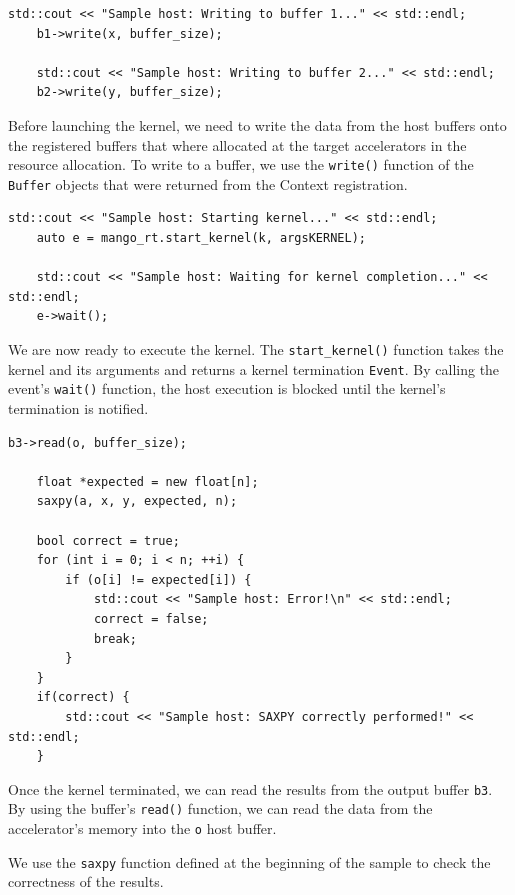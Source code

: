 \begin{lstlisting}[style=CStyle, caption=Sample - Writing buffers]
    std::cout << "Sample host: Writing to buffer 1..." << std::endl;
    b1->write(x, buffer_size);

    std::cout << "Sample host: Writing to buffer 2..." << std::endl;
    b2->write(y, buffer_size);
\end{lstlisting}

Before launching the kernel, we need to write the data from the host buffers onto the registered buffers that where allocated at the target accelerators in the resource allocation. To write to a buffer, we use the \texttt{write()} function of the \texttt{Buffer} objects that were returned from the Context registration.
    
\begin{lstlisting}[style=CStyle, caption=Sample - Kernel launch]
    std::cout << "Sample host: Starting kernel..." << std::endl;
    auto e = mango_rt.start_kernel(k, argsKERNEL);

    std::cout << "Sample host: Waiting for kernel completion..." << std::endl;
    e->wait();
\end{lstlisting}

We are now ready to execute the kernel. The \texttt{start\_kernel()} function takes the kernel and its arguments and returns a kernel termination \texttt{Event}. By calling the event's \texttt{wait()} function, the host execution is blocked until the kernel's termination is notified.

\begin{lstlisting}[style=CStyle, caption=Sample - Checking results]
    b3->read(o, buffer_size);

    float *expected = new float[n];
    saxpy(a, x, y, expected, n);

    bool correct = true;
    for (int i = 0; i < n; ++i) {
        if (o[i] != expected[i]) {
            std::cout << "Sample host: Error!\n" << std::endl;
            correct = false;
            break;
        }
    }
    if(correct) {
        std::cout << "Sample host: SAXPY correctly performed!" << std::endl;
    }
\end{lstlisting}

Once the kernel terminated, we can read the results from the output buffer \texttt{b3}. By using the buffer's \texttt{read()} function, we can read the data from the accelerator's memory into the \texttt{o} host buffer.

We use the \texttt{saxpy} function defined at the beginning of the sample to check the correctness of the results.

